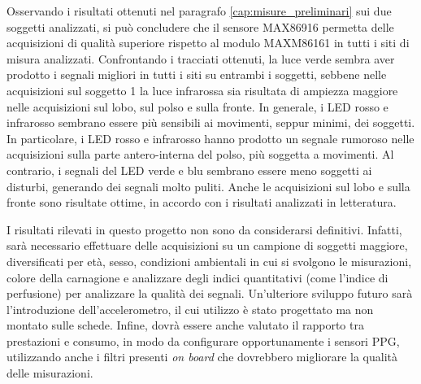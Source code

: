 \documentclass[
	a4paper,
	cleardoublepage=empty,
	headings=twolinechapter,
	numbers=autoenddot,
]{scrbook}
\begin{document}
	Osservando i risultati ottenuti nel paragrafo \ref{cap:misure_preliminari} sui due soggetti analizzati, si può concludere che il sensore MAX86916 permetta delle acquisizioni di qualità superiore rispetto al modulo MAXM86161 in tutti i siti di misura analizzati. Confrontando i tracciati ottenuti, la luce verde sembra aver prodotto i segnali migliori in tutti i siti su entrambi i soggetti, sebbene nelle acquisizioni sul soggetto 1 la luce infrarossa sia risultata di ampiezza maggiore nelle acquisizioni sul lobo, sul polso e sulla fronte. In generale, i LED rosso e infrarosso sembrano essere più sensibili ai movimenti, seppur minimi, dei soggetti. In particolare, i LED rosso e infrarosso hanno prodotto un segnale rumoroso nelle acquisizioni sulla parte antero-interna del polso, più soggetta a movimenti. Al contrario, i segnali del LED verde e blu sembrano essere meno soggetti ai disturbi, generando dei segnali molto puliti. Anche le acquisizioni sul lobo e sulla fronte sono risultate ottime, in accordo con i risultati analizzati in letteratura.
	
	I risultati rilevati in questo progetto non sono da considerarsi definitivi. Infatti, sarà necessario effettuare delle acquisizioni su un campione di soggetti maggiore, diversificati per età, sesso, condizioni ambientali in cui si svolgono le misurazioni, colore della carnagione e analizzare degli indici quantitativi (come l'indice di perfusione) per analizzare la qualità dei segnali. Un'ulteriore sviluppo futuro sarà l'introduzione dell'accelerometro, il cui utilizzo è stato progettato ma non montato sulle schede. Infine, dovrà essere anche valutato il rapporto tra prestazioni e consumo, in modo da configurare opportunamente i sensori PPG, utilizzando anche i filtri presenti \textit{on board} che dovrebbero migliorare la qualità delle misurazioni.
	
	
	
	
	
	
	
\end{document}

